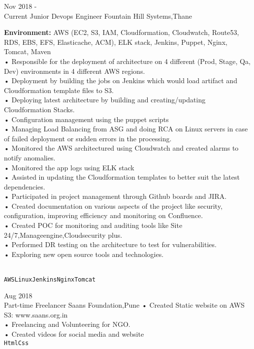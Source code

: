 \documentclass[9pt]{developercv} %
\begin{document}

\begin{entrylist}
	\entry
		{Nov 2018 -\\Current}
		{Junior Devops Engineer}
		{Fountain Hill Systems,Thane}
		{\textbf{Environment:} AWS (EC2, S3, IAM, Cloudformation, Cloudwatch, Route53, RDS, EBS, EFS, Elasticache, ACM), ELK stack, Jenkins, Puppet, Nginx, Tomcat, Maven\\
		• Responsible for the deployment of architecture on 4 different (Prod, Stage, Qa, Dev) environments in 4 different AWS regions.\\
		• Deployment by building the jobs on Jenkins which would load artifact and Cloudformation template files to S3.\\
		• Deploying latest architecture by building and creating/updating Cloudformation Stacks.\\
		• Configuration management using the puppet scripts\\
		• Managing Load Balancing from ASG and doing RCA on Linux servers in case of failed deployment or sudden errors in the processing.\\
		• Monitored the AWS architectured using Cloudwatch and created alarms to notify anomalies.\\
		• Monitored the app logs using ELK stack\\
 • Assisted in updating the Cloudformation templates to better suit the latest dependencies.\\
 • Participated in project management through Github boards and JIRA.\\
 • Created documentation on various aspects of the project like security, configuration, improving efficiency and monitoring on Confluence.\\
  • Created POC for monitoring and auditing tools like Site 24/7,Manageengine,Cloudsecurity plus.\\
• Performed DR testing on the architecture to test for vulnerabilities. \\
• Exploring new open source tools and technologies.
 

\\ \texttt{AWS}\slashsep\texttt{Linux}\slashsep\texttt{Jenkins}\slashsep\texttt{Nginx}\slashsep\texttt{Tomcat}}
	\entry
		{Aug 2018\\\footnotesize{Part-time}}
		{Freelancer}
		{Saans Foundation,Pune}
		{• Created Static website on AWS S3: www.saans.org.in \\ 
	    • Freelancing and Volunteering for NGO. \\
	   • Created videos for social media and website\\\texttt{Html}\slashsep\texttt{Css}}
		

\end{entrylist}
\end{document}
